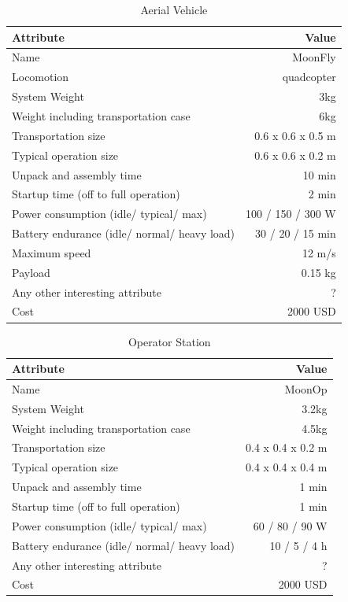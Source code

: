 \documentclass[journal]{IEEEtran}
\begin{document}
\begin{table}
\renewcommand{\arraystretch}{1}
 \tabcolsep=0.1cm
\caption{Aerial Vehicle}
\label{tab:SystemRobot2}
\centering
\begin{tabular}{|l|r|}
\hline
Attribute & Value \\ \hline
Name & MoonFly \\
Locomotion & quadcopter \\
System Weight & 3kg \\
Weight including transportation case & 6kg \\
Transportation size & 0.6 x 0.6 x 0.5 m \\
Typical operation size & 0.6 x 0.6  x 0.2 m \\
Unpack and assembly time & 10 min \\
Startup time (off to full operation) & 2 min \\
Power consumption (idle/ typical/ max) & 100 / 150 / 300 W \\
Battery endurance (idle/ normal/ heavy load) & 30 / 20 / 15 min\\
Maximum speed & 12 m/s\\
Payload  & 0.15 kg\\
Any other interesting attribute & ?\\
Cost & 2000 USD \\
\hline
\end{tabular}
\end{table}


\begin{table}
\renewcommand{\arraystretch}{1}
 \tabcolsep=0.1cm
\caption{Operator Station}
\label{tab:SystemOp1}
\centering
\begin{tabular}{|l|r|}
\hline
Attribute & Value \\ \hline
Name & MoonOp \\
System Weight & 3.2kg \\
Weight including transportation case & 4.5kg \\
Transportation size & 0.4 x 0.4 x 0.2 m \\
Typical operation size & 0.4 x 0.4  x 0.4 m \\
Unpack and assembly time & 1 min \\
Startup time (off to full operation) & 1 min \\
Power consumption (idle/ typical/ max) & 60 / 80 / 90 W \\
Battery endurance (idle/ normal/ heavy load) & 10 / 5 / 4 h\\
Any other interesting attribute & ?\\
Cost & 2000 USD \\
\hline
\end{tabular}
\end{table}
\end{document}
